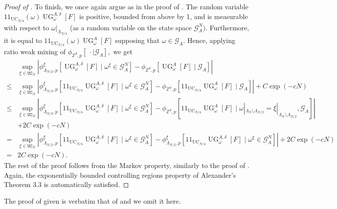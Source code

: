 \documentclass[article,11pt,reqno]{amsart}
\newcommand{\id}{1\! \!1}
\begin{document}
\begin{proof}[Proof of ]
To finish, we once again argue as in the proof of \cite[Theorem 1.3]{hansen2023uniform}. The random variable $\id_{\operatorname{UC}_{N/4}}(\omega) \operatorname{UG}^{A,\delta}_{\omega}[F]$ is positive, bounded from above by 1, and is measurable with respect to $\omega|_{\Lambda_{N/4}}$ (as a random variable on the state space $\mathcal{G}^N_A)$. Furthermore, it is equal to $\id_{\operatorname{UC}_{N/4}}(\omega)\operatorname{UG}^{A}_{\omega}[F]$ supposing that $\omega\in \mathcal{G}_A$.
Hence, applying ratio weak mixing of $\phi_{\mathbb{Z}^d,p}[\;\cdot \mid \mathcal{G}_A],$ we get
\begin{align*}
&\sup_{\xi\in \mathtt{UC}_N} |\phi^{\xi}_{\Lambda_{N/2},p}[\operatorname{UG}^{A,\delta}_{\omega}[F] \mid \omega^{\xi}\in \mathcal{G}^{N}_A]-\phi_{\mathbb{Z}^d,p}[\operatorname{UG}^A_{\omega}[F]\mid \mathcal{G}_A]|\\
\leq& \sup_{\xi \in \mathtt{UC}_N} |\phi^{\xi}_{\Lambda_{N/2},p}[\id_{\operatorname{UC}_{N/4}}\operatorname{UG}^{A,\delta}_{\omega}[F] \mid \omega^{\xi}\in \mathcal{G}^{N}_A]-\phi_{\mathbb{Z}^d,p}[\id_{\operatorname{UC}_{N/4}}\operatorname{UG}^A_{\omega}[F]\mid \mathcal{G}_A]|+C\exp(-cN)\\
\leq &\sup_{\xi\in \mathtt{UC}_N} |\phi^{\xi}_{\Lambda_{N/2},p}[\id_{\operatorname{UC}_{N/4}}\operatorname{UG}^{A,\delta}_{\omega}[F] \mid \omega^{\xi}\in \mathcal{G}^{N}_A]
-\phi_{\mathbb{Z}^d,p}[\id_{\operatorname{UC}_{N/4}}\operatorname{UG}^A_{\omega}[F]\mid \omega|_{\Lambda_N\setminus \Lambda_{N/2}}=\xi|_{\Lambda_N\setminus\Lambda_{N/2}},\mathcal{G}_A]|
\\&+2C\exp(-cN)\\
=&\sup_{\xi\in \mathtt{UC}_N} |\phi^{\xi}_{\Lambda_{N/2},p}[\id_{\operatorname{UC}_{N/4}}\operatorname{UG}^{A,\delta}_{\omega}[F] \mid \omega^{\xi}\in \mathcal{G}^{N}_A]-\phi^{\xi}_{\Lambda_{N/2},p}[\id_{\operatorname{UC}_{N/4}}\operatorname{UG}^{A,\delta}_{\omega}[F]\mid \omega^{\xi}\in\mathcal{G}^N_A]|+2C\exp(-cN) \\
=&2C\exp(-cN).
\end{align*}
The rest of the proof follows from the Markov property, similarly to the proof of . Again, the exponentially bounded controlling regions property of Alexander's Theorem 3.3 is automatically satisfied.
\end{proof}
The proof of  given  is verbatim that of  and we omit it here.
\end{document}
